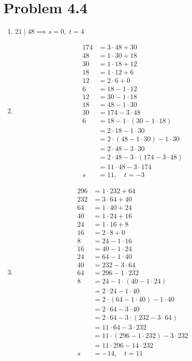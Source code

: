\documentclass[12pt]{article}
\begin{document}
\section*{Problem 4.4}
\begin{enumerate}[label=\alph*)]
    \item  $21\;|\;48 \implies s= 0, \; t=4$
\item
\begin{align*}
    174 &= 3 \cdot 48 + 30 \\
    48 &= 1 \cdot 30 + 18 \\
    30 &= 1 \cdot 18 + 12 \\
    18 &= 1 \cdot 12 + 6 \\
    12 &= 2 \cdot 6 + 0 \\[1em]
    6 &= 18 - 1 \cdot 12 \\
    12 &= 30 - 1 \cdot 18 \\
    18 &= 48 - 1 \cdot 30 \\
    30 &= 174 - 3 \cdot 48 \\[1em]
    6 &= 18 - 1 \cdot (30 - 1 \cdot 18) \\
      &= 2 \cdot 18 - 1 \cdot 30 \\
      &= 2 \cdot (48 - 1 \cdot 30) - 1 \cdot 30 \\
      &= 2 \cdot 48 - 3 \cdot 30 \\
      &= 2 \cdot 48 - 3 \cdot (174 - 3 \cdot 48) \\
      &= 11 \cdot 48 - 3 \cdot 174 \\[1em]
    s &= 11, \quad t = -3
\end{align*}
    \item 
    \begin{align*}
    296 &= 1 \cdot 232 + 64 \\
    232 &= 3 \cdot 64 + 40 \\
    64 &= 1 \cdot 40 + 24 \\
    40 &= 1 \cdot 24 + 16 \\
    24 &= 1 \cdot 16 + 8 \\
    16 &= 2 \cdot 8 + 0 \\[1em]
    8 &= 24 - 1 \cdot 16 \\
    16 &= 40 - 1 \cdot 24 \\
    24 &= 64 - 1 \cdot 40 \\
    40 &= 232 - 3 \cdot 64 \\
    64 &= 296 - 1 \cdot 232 \\[1em]
    8 &= 24 - 1 \cdot (40 - 1 \cdot 24) \\
      &= 2 \cdot 24 - 1 \cdot 40 \\
      &= 2 \cdot (64 - 1 \cdot 40) - 1 \cdot 40 \\
      &= 2 \cdot 64 - 3 \cdot 40 \\
      &= 2 \cdot 64 - 3 \cdot (232 - 3 \cdot 64) \\
      &= 11 \cdot 64 - 3 \cdot 232 \\
      &= 11 \cdot (296 - 1 \cdot 232) - 3 \cdot 232 \\
      &= 11 \cdot 296 - 14 \cdot 232 \\[1em]
    s &= -14, \quad t = 11
\end{align*}
    

\end{enumerate}
\end{document}
